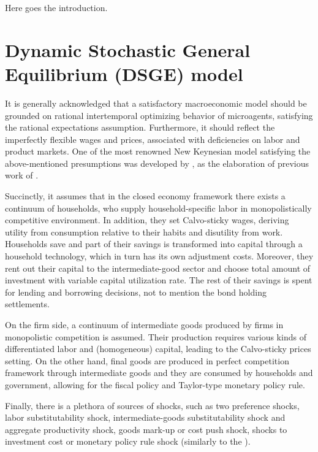 \documentclass{pracamgr}
\numberwithin{equation}{section}
\begin{document}
Here goes the introduction. \\

\chapter{Dynamic Stochastic General Equilibrium (DSGE) model} \label{Dynamic Stochastic General Equilibrium (DSGE) model}

It is generally acknowledged that a satisfactory macroeconomic model should be grounded on rational intertemporal optimizing behavior of microagents, satisfying the rational expectations assumption. Furthermore, it should reflect the imperfectly flexible wages and prices, associated with deficiencies on labor and product markets. One of the most renowned New Keynesian model satisfying the above-mentioned presumptions was developed by \citet{smets2003estimated}, as the elaboration of previous work of \citet{christiano2005nominal}.

Succinctly, it assumes that in the closed economy framework there exists a continuum of households, who supply household-specific labor in monopolistically competitive environment. In addition, they set Calvo-sticky wages, deriving utility from consumption relative to their habits and disutility from work. Households save and part of their savings is transformed into capital through a household technology, which in turn has its own adjustment costs. Moreover, they rent out their capital to the intermediate-good sector and choose total amount of  investment with variable capital utilization rate. The rest of their savings is spent for lending and borrowing decisions, not to mention the bond holding settlements.

On the firm side, a continuum of intermediate goods produced by firms in monopolistic competition is assumed. Their production requires various kinds of differentiated labor and (homogeneous) capital, leading to the Calvo-sticky prices setting. On the other hand, final goods are produced in perfect competition framework through intermediate goods and they are consumed by households and government, allowing for the fiscal policy and Taylor-type monetary policy rule.

Finally, there is a plethora of sources of shocks, such as two preference shocks, labor substitutability shock, intermediate-goods substitutability shock and aggregate productivity shock, goods mark-up or cost push shock, shocks to investment cost or monetary policy rule shock (similarly to the \citet{christiano2005nominal}).
\end{document}
